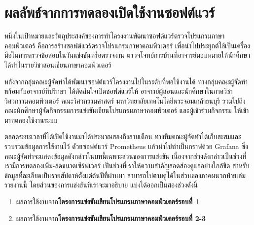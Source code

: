 \documentclass[12pt,one side,openright,a4paper]{cpe-thesis-th}
\newcommand{\thaijustify}[1]{%
  \par\hspace{30pt}\justifying
  #1
}
\begin{document}
\section{ผลลัพธ์จากการทดลองเปิดใช้งานซอฟต์แวร์}
    \thaijustify{
        หนึ่งในเป้าหมายและวัตถุประสงค์ของการทำโครงงานพัฒนาซอฟต์แวร์ตรวจโปรแกรมภาษาคอมพิวเตอร์ คือการสร้างซอฟต์แวร์ตรวจโปรแกรมภาษาคอมพิวเตอร์ เพื่อนำไปประยุกต์ใช้เป็นเครื่องมือในการตรวจข้อสอบในวันแข่งขันหรือตรวจงาน ตรวจโจทย์การบ้านที่อาจารย์มอบหมายให้นักศึกษาได้ทำในรายวิชาสอนเขียนภาษาคอมพิวเตอร์
    }
    \thaijustify{
        หลังจากกลุ่มคณะผู้จัดทำได้พัฒนาซอฟต์แวร์โครงงานไปในระดับที่พอใช้งานได้ ทางกลุ่มคณะผู้จัดทำพร้อมกับอาจารย์ที่ปรึกษา ได้ตัดสินใจเปิดซอฟต์แวร์ให้ อาจารย์ผู้สอนและนักศึกษาในภาควิชาวิศวกรรมคอมพิวเตอร์ คณะวิศวกรรมศาสตร์ มหาวิทยาลัยเทคโนโลยีพระจอมเกล้าธนบุรี รวมไปถึงคณะนักศึกษาผู้จัดกิจกรรมการแข่งขันเขียนโปรแกรมภาษาคอมพิวเตอร์ และผู้เข้าร่วมกิจกรรม ให้เข้ามาทดลองใช้งานระบบ
    }
    \thaijustify{
        ตลอดระยะเวลาที่ได้เปิดใช้งานมาได้ประมาณสองถึงสามเดือน ทางทีมคณะผู้จัดทำได้เก็บสะสมและรวบรวมข้อมูลการใช้งานไว้ ดัวยซอฟต์แวร์ Prometheus แล้วนำไปทำเป็นกราฟด้วย Grafana ซึ่งคณะผู้จัดทำจะแสดงข้อมูลดังกล่าวในบทนี้เฉพาะส่วนของการแข่งขัน เนื่องจากช่วงดังกล่าวเป็นช่วงที่เรามีการทดลองเพิ่ม-ลดขนาดเซิร์ฟเวอร์ เป็นช่วงที่เราให้ความสำคัญสอดส่องดูแลอย่างใกล้ชิด สำหรับข้อมูลที่ละเอียดเป็นรายสัปดาห์ตั้งแต่ต้นปีที่ผ่านมา สามารถไปตามดูได้ในส่วนของภาคผนวกท้ายเล่มรายงานนี้ โดยส่วนของการแข่งขันที่เราจะมาอธิบาย แบ่งได้ออกเป็นสองช่วงดังนี้
    }
    \begin{enumerate}
        \item ผลการใช้งานจาก\textbf{โครงการแข่งขันเขียนโปรแกรมภาษาคอมพิวเตอร์รอบที่ 1}
        \item ผลการใช้งานจาก\textbf{โครงการแข่งขันเขียนโปรแกรมภาษาคอมพิวเตอร์รอบที่ 2-3}
    \end{enumerate}
\end{document}
